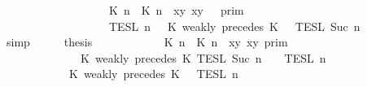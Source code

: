 \begin{isabellebody}
\ \ \ \ \ \ \ \ \ \ \ \ \ \ \ \ {\isacharequal}\ {\isasymlbrakk}{\isasymlbrakk}\ {\isacharparenleft}{\isasymlceil}{\isacharhash}\isactrlsup {\isasymle}\ K\ n{\isacharcomma}\ {\isacharhash}\isactrlsup {\isasymle}\ K\ n{\isasymrceil}\ {\isasymin}\ {\isacharparenleft}{\isasymlambda}{\isacharparenleft}x{\isacharcomma}y{\isacharparenright}{\isachardot}\ x{\isasymle}y{\isacharparenright}{\isacharparenright}\ {\isacharhash}\ {\isasymGamma}\ {\isasymrbrakk}{\isasymrbrakk}\isactrlsub p\isactrlsub r\isactrlsub i\isactrlsub m\isanewline
\ \ \ \ \ \ \ \ \ \ \ \ \ \ \ \ {\isasyminter}\ {\isasymlbrakk}{\isasymlbrakk}\ {\isasymPsi}\ {\isasymrbrakk}{\isasymrbrakk}\isactrlsub T\isactrlsub E\isactrlsub S\isactrlsub L\isactrlbsup {\isasymge}\ n\isactrlesup \ {\isasyminter}\ {\isasymlbrakk}{\isasymlbrakk}\ {\isacharparenleft}K\ weakly\ precedes\ K\ {\isacharhash}\ {\isasymPhi}\ {\isasymrbrakk}{\isasymrbrakk}\isactrlsub T\isactrlsub E\isactrlsub S\isactrlsub L\isactrlbsup {\isasymge}\ Suc\ n\isactrlesup {\isacartoucheclose}\isanewline
\ \ \ \ \isamarkupfalse%
\ simp\isanewline
\ \ \isamarkupfalse%
\ \isamarkupfalse%
\ {\isacharquery}thesis\isanewline
\ \ \isamarkupfalse%
\ {\isacharminus}\isanewline
\ \ \ \ \isamarkupfalse%
\ {\isacartoucheopen}{\isasymlbrakk}\ {\isasymlceil}{\isacharhash}\isactrlsup {\isasymle}\ K\ n{\isacharcomma}\ {\isacharhash}\isactrlsup {\isasymle}\ K\ n{\isasymrceil}\ {\isasymin}\ {\isacharparenleft}{\isasymlambda}{\isacharparenleft}x{\isacharcomma}y{\isacharparenright}{\isachardot}\ x{\isasymle}y{\isacharparenright}\ {\isasymrbrakk}\isactrlsub p\isactrlsub r\isactrlsub i\isactrlsub m\isanewline
\ \ \ \ \ \ \ \ \ \ \ \ {\isasyminter}\ {\isasymlbrakk}\ K\ weakly\ precedes\ K\ {\isasymrbrakk}\isactrlsub T\isactrlsub E\isactrlsub S\isactrlsub L\isactrlbsup {\isasymge}\ Suc\ n\isactrlesup \ {\isasyminter}\ {\isasymlbrakk}{\isasymlbrakk}\ {\isasymPsi}\ {\isasymrbrakk}{\isasymrbrakk}\isactrlsub T\isactrlsub E\isactrlsub S\isactrlsub L\isactrlbsup {\isasymge}\ n\isactrlesup \isanewline
\ \ \ \ \ \ \ \ \ \ {\isacharequal}\ {\isasymlbrakk}{\isasymlbrakk}\ {\isacharparenleft}K\ weakly\ precedes\ K\ {\isacharhash}\ {\isasymPsi}\ {\isasymrbrakk}{\isasymrbrakk}\isactrlsub T\isactrlsub E\isactrlsub S\isactrlsub L\isactrlbsup {\isasymge}\ n\isactrlesup {\isacartoucheclose}\isanewline

\end{isabellebody}
